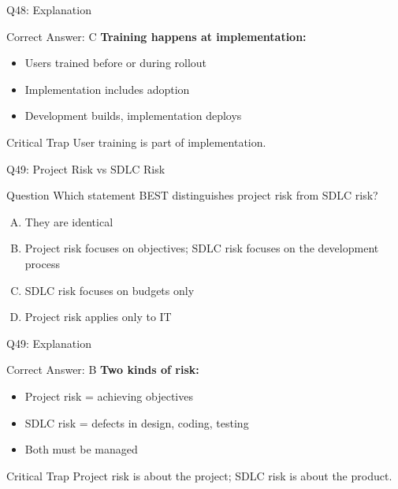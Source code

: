 \documentclass{beamer}
\begin{document}
	\begin{frame}{Q48: Explanation}
		\begin{block}{Correct Answer: C}
			\textbf{Training happens at implementation:}
			\begin{itemize}
				\item Users trained before or during rollout
				\item Implementation includes adoption
				\item Development builds, implementation deploys
			\end{itemize}
		\end{block}
		\begin{alertblock}{Critical Trap}
			User training is part of implementation.
		\end{alertblock}
	\end{frame}
	
	\begin{frame}{Q49: Project Risk vs SDLC Risk}
		\begin{block}{Question}
			Which statement BEST distinguishes project risk from SDLC risk?
		\end{block}
		\begin{enumerate}[(A)]
			\item They are identical
			\item Project risk focuses on objectives; SDLC risk focuses on the development process
			\item SDLC risk focuses on budgets only
			\item Project risk applies only to IT
		\end{enumerate}
	\end{frame}
	
	\begin{frame}{Q49: Explanation}
		\begin{block}{Correct Answer: B}
			\textbf{Two kinds of risk:}
			\begin{itemize}
				\item Project risk = achieving objectives
				\item SDLC risk = defects in design, coding, testing
				\item Both must be managed
			\end{itemize}
		\end{block}
		\begin{alertblock}{Critical Trap}
			Project risk is about the project; SDLC risk is about the product.
		\end{alertblock}
	\end{frame}
	
\end{document}
